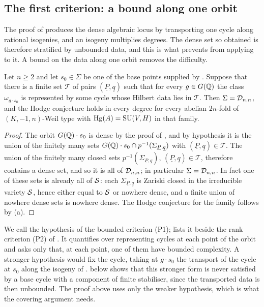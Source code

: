 \subsection{The first criterion: a bound along one orbit}

The proof of  produces the dense algebraic locus by
transporting one cycle along rational isogenies, and an isogeny multiplies
degrees. The dense set so obtained is therefore stratified by unbounded data,
and this is what prevents  from applying to it. A bound
on the data along one orbit removes the difficulty.

\begin{theorem}\label{thm:degreebound}
Let $n\ge2$ and let $s_{0}\in\Sigma$ be one of the base points supplied by
. Suppose that there is a finite set $\mathcal{T}$ of pairs
$(\underline{P},\underline{q})$ such that for every $g\in G(\mathbb{Q})$ the class
$\omega_{g\cdot s_{0}}$ is represented by some cycle whose Hilbert data lies
in $\mathcal{T}$. Then $\Sigma=\mathcal{D}_{n,n}$, and the Hodge conjecture holds in every
degree for every abelian $2n$-fold of $(K,-1,n)$-Weil type with
$\operatorname{Hg}(A)=\operatorname{SU}(V,H)$ in that family.
\end{theorem}

\begin{proof}
The orbit $G(\mathbb{Q})\cdot s_{0}$ is dense by the proof of ,
and by hypothesis it is the union of the finitely many sets
$G(\mathbb{Q})\cdot s_{0}\cap p^{-1}(\Sigma_{\underline{P},\underline{q}})$ with
$(\underline{P},\underline{q})\in\mathcal{T}$. The union of the finitely
many closed sets $p^{-1}(\Sigma_{\underline{P},\underline{q}})$,
$(\underline{P},\underline{q})\in\mathcal{T}$, therefore contains a dense set,
and so it is all of $\mathcal{D}_{n,n}$; in particular $\Sigma=\mathcal{D}_{n,n}$. In fact one
of these sets is already all of $\mathcal{S}$: each
$\Sigma_{\underline{P},\underline{q}}$ is Zariski closed in the irreducible
variety $\mathcal{S}$, hence either equal to $\mathcal{S}$ or nowhere dense, and a finite
union of nowhere dense sets is nowhere dense. The Hodge conjecture for the
family follows by (a).
\end{proof}

\begin{remark}\label{rem:chosencycle}
We call the hypothesis of  the bounded criterion
\textup{(P1)};  lists it beside the rank criterion
\textup{(P2)} of . It quantifies over representing
cycles at each point of the orbit and asks only that, at each point, one of
them have bounded complexity. A stronger hypothesis would fix the cycle,
taking at $g\cdot s_{0}$ the transport of the cycle at $s_{0}$ along the
isogeny of .  below shows that this
stronger form is never satisfied by a base cycle with a component of finite
stabiliser, since the transported data is then unbounded. The proof above
uses only the weaker hypothesis, which is what the covering argument needs.
\end{remark}

